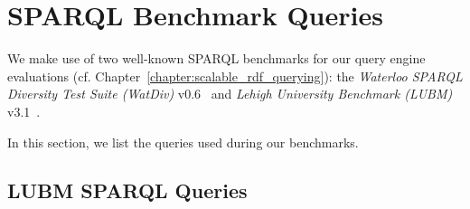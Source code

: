 \chapter{SPARQL Benchmark Queries}
\label{sec:appendix-sparql-benchmark-queries}
We make use of two well-known \gls{SPARQL} benchmarks for our query engine evaluations (cf. Chapter~\ref{chapter:scalable_rdf_querying}): 
the \textit{Waterloo \gls{SPARQL} Diversity Test Suite (WatDiv)} v0.6~\cite{Alu2014DiversifiedST} and \textit{Lehigh University Benchmark (LUBM)} v3.1~\cite{Guo2005LUBMAB}.

In this section, we list the queries used during our benchmarks.

\section{LUBM SPARQL Queries}

